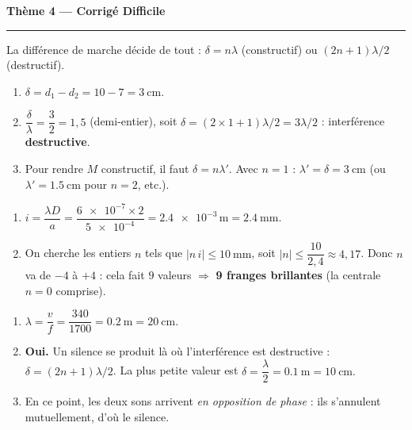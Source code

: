\documentclass[11pt,a4paper]{article}
\begin{document}
\begin{center}
{\large\bfseries\color{excol} Thème 4 — Corrigé Difficile}\\[-2pt]
{\color{excol}\rule{5cm}{1pt}}
\end{center}

\begin{corrige}
La différence de marche décide de tout : $\delta=n\lambda$ (constructif) ou
$(2n+1)\lambda/2$ (destructif).
\begin{enumerate}[label=\alph*)]
  \item $\delta=d_1-d_2=10-7=\SI{3}{\centi\metre}.$
  \item $\dfrac{\delta}{\lambda}=\dfrac{3}{2}=1{,}5$ (demi-entier), soit
        $\delta=(2\times1+1)\lambda/2=3\lambda/2$ : interférence \textbf{destructive}.
  \item Pour rendre $M$ constructif, il faut $\delta=n\lambda'$. Avec $n=1$ :
        $\lambda'=\delta=\SI{3}{\centi\metre}$ (ou $\lambda'=\SI{1.5}{\centi\metre}$ pour $n=2$,
        etc.).
\end{enumerate}
\end{corrige}

\begin{corrige}
\begin{enumerate}[label=\alph*)]
  \item $i=\dfrac{\lambda D}{a}=\dfrac{\num{6e-7}\times 2}{\num{5e-4}}
        =\num{2.4e-3}\,\si{\metre}=\SI{2.4}{\milli\metre}.$
  \item On cherche les entiers $n$ tels que $|n\,i|\le\SI{10}{\milli\metre}$, soit
        $|n|\le\dfrac{10}{2{,}4}\approx 4{,}17$. Donc $n$ va de $-4$ à $+4$ : cela fait
        $9$ valeurs $\Rightarrow$ \textbf{9 franges brillantes} (la centrale $n=0$ comprise).
\end{enumerate}
\end{corrige}

\begin{corrige}
\begin{enumerate}[label=\alph*)]
  \item $\lambda=\dfrac{v}{f}=\dfrac{340}{1700}=\SI{0.2}{\metre}=\SI{20}{\centi\metre}.$
  \item \textbf{Oui.} Un silence se produit là où l'interférence est destructive :
        $\delta=(2n+1)\lambda/2$. La plus petite valeur est
        $\delta=\dfrac{\lambda}{2}=\SI{0.1}{\metre}=\SI{10}{\centi\metre}.$
  \item En ce point, les deux sons arrivent \emph{en opposition de phase} : ils s'annulent
        mutuellement, d'où le silence.
\end{enumerate}
\end{corrige}
\end{document}
